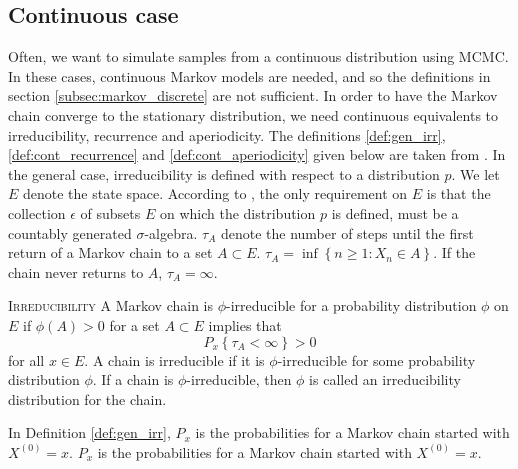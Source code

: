 \subsection{Continuous case}
Often, we want to simulate samples from a continuous distribution using MCMC. In these cases, continuous Markov models are needed, and so the definitions in section \ref{subsec:markov_discrete} are not sufficient. 
In order to have the Markov chain converge to the stationary distribution, we need continuous equivalents to irreducibility, recurrence and aperiodicity. The definitions \ref{def:gen_irr}, \ref{def:cont_recurrence} and \ref{def:cont_aperiodicity} given below are taken from \cite{MCMC_in_pract}. 
In the general case, irreducibility is defined with respect to a distribution $p$. 
We let $E$ denote the state space. According to \cite{MCMC_in_pract}, the only requirement on $E$ is that the collection $\epsilon$ of subsets $E$ on which the distribution $p$ is defined, must be a countably generated $\sigma$-algebra.  $\tau_A$ denote the number of steps until the first return of a Markov chain to a set $A\subset E$.  
$\tau_A = \inf\left\{n\geq 1 : X_n \in A\right\}$. If the chain never returns to $A$, $\tau_A = \infty$.
\begin{definition}{\textsc{Irreducibility}}\label{def:gen_irr}
   A Markov chain is $\phi$-irreducible for a probability distribution $\phi$ on $E$ if $\phi\left(A\right) > 0$ for a set $A\subset E$ implies that $$P_x\left\{\tau_A < \infty\right\} > 0$$ for all $x\in E$. A chain is irreducible if it is $\phi$-irreducible for some probability distribution $\phi$. If a chain is $\phi$-irreducible, then $\phi$ is called an irreducibility distribution for the chain. 
\end{definition}
In Definition \ref{def:gen_irr}, $P_x$ is the probabilities for a Markov chain started with $X^{\left(0\right)} = x$. $P_x$ is the probabilities for a Markov chain started with $X^{\left(0\right)} = x$. 

